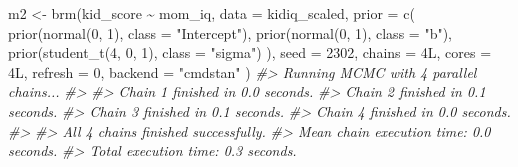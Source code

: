 \documentclass[
  10pt,
  italian,
  a4paper,
  extrafontsizes,onecolumn,openright
  ]{memoir}
\newenvironment{Shaded}{\begin{snugshade}}{\end{snugshade}}
\newcommand{\AttributeTok}[1]{\textcolor[rgb]{0.77,0.63,0.00}{#1}}
\newcommand{\CommentTok}[1]{\textcolor[rgb]{0.56,0.35,0.01}{\textit{#1}}}
\newcommand{\DecValTok}[1]{\textcolor[rgb]{0.00,0.00,0.81}{#1}}
\newcommand{\FunctionTok}[1]{\textcolor[rgb]{0.00,0.00,0.00}{#1}}
\newcommand{\NormalTok}[1]{#1}
\newcommand{\OtherTok}[1]{\textcolor[rgb]{0.56,0.35,0.01}{#1}}
\newcommand{\SpecialCharTok}[1]{\textcolor[rgb]{0.00,0.00,0.00}{#1}}
\newcommand{\StringTok}[1]{\textcolor[rgb]{0.31,0.60,0.02}{#1}}
\theoremstyle{definition}
\theoremstyle{definition}
\theoremstyle{definition}
\theoremstyle{definition}
\theoremstyle{remark}
\begin{document}
\begin{Shaded}
\begin{Highlighting}[]
\NormalTok{m2 }\OtherTok{\textless{}{-}} \FunctionTok{brm}\NormalTok{(kid\_score }\SpecialCharTok{\textasciitilde{}}\NormalTok{ mom\_iq,}
  \AttributeTok{data =}\NormalTok{ kidiq\_scaled,}
  \AttributeTok{prior =} \FunctionTok{c}\NormalTok{(}
    \FunctionTok{prior}\NormalTok{(}\FunctionTok{normal}\NormalTok{(}\DecValTok{0}\NormalTok{, }\DecValTok{1}\NormalTok{), }\AttributeTok{class =} \StringTok{"Intercept"}\NormalTok{),}
    \FunctionTok{prior}\NormalTok{(}\FunctionTok{normal}\NormalTok{(}\DecValTok{0}\NormalTok{, }\DecValTok{1}\NormalTok{), }\AttributeTok{class =} \StringTok{"b"}\NormalTok{),}
    \FunctionTok{prior}\NormalTok{(}\FunctionTok{student\_t}\NormalTok{(}\DecValTok{4}\NormalTok{, }\DecValTok{0}\NormalTok{, }\DecValTok{1}\NormalTok{), }\AttributeTok{class =} \StringTok{"sigma"}\NormalTok{)}
\NormalTok{  ),}
  \AttributeTok{seed =} \DecValTok{2302}\NormalTok{,}
  \AttributeTok{chains =}\NormalTok{ 4L,}
  \AttributeTok{cores =}\NormalTok{ 4L,}
  \AttributeTok{refresh =} \DecValTok{0}\NormalTok{,}
  \AttributeTok{backend =} \StringTok{"cmdstan"}
\NormalTok{)}
\CommentTok{\#\textgreater{} Running MCMC with 4 parallel chains...}
\CommentTok{\#\textgreater{} }
\CommentTok{\#\textgreater{} Chain 1 finished in 0.0 seconds.}
\CommentTok{\#\textgreater{} Chain 2 finished in 0.1 seconds.}
\CommentTok{\#\textgreater{} Chain 3 finished in 0.1 seconds.}
\CommentTok{\#\textgreater{} Chain 4 finished in 0.0 seconds.}
\CommentTok{\#\textgreater{} }
\CommentTok{\#\textgreater{} All 4 chains finished successfully.}
\CommentTok{\#\textgreater{} Mean chain execution time: 0.0 seconds.}
\CommentTok{\#\textgreater{} Total execution time: 0.3 seconds.}
\end{Highlighting}
\end{Shaded}
\end{document}
